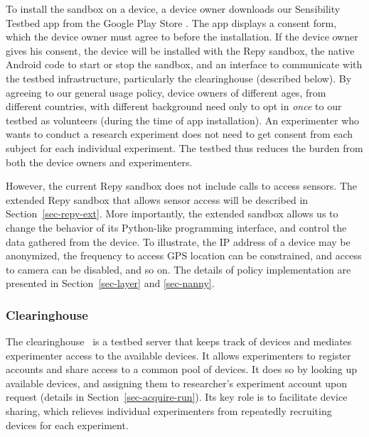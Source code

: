 To install the sandbox on a device, a device owner downloads 
our Sensibility Testbed app from the Google Play Store \cite{sensibility-app}.
The app displays a consent form, which the device owner must 
agree to before the installation. If the device owner gives his
consent, the device will be installed with the Repy sandbox, the native Android code to 
start or stop the sandbox, and an interface to communicate with the testbed 
infrastructure, particularly the clearinghouse (described below). 
By agreeing to our general usage policy, device 
owners of different ages, from different countries, with different
background need only to opt in \textit{once} to our testbed as 
volunteers (during the time of app installation). An experimenter 
who wants to conduct a research experiment 
does not need to get consent from each subject for each individual
experiment. The testbed thus reduces the burden from both the 
device owners and experimenters. 

However, the current Repy sandbox does not include calls to access sensors. 
The extended Repy sandbox that allows sensor access  
will be described in Section~\ref{sec-repy-ext}.
More importantly, the extended sandbox allows us to change the 
behavior of its Python-like programming interface, and control the 
data gathered from the device. 
To illustrate, the IP address of a device may be anonymized, 
the frequency to access GPS location can be constrained, and 
access to camera can be disabled, and so on. 
The details of policy implementation are presented in 
Section~\ref{sec-layer} and \ref{sec-nanny}.

\subsubsection{Clearinghouse}\label{sec-ch}
The clearinghouse~\cite{ch} is a testbed server that keeps 
track of devices and mediates experimenter access to the 
available devices. It allows experimenters to register 
accounts and share access to a common pool of devices.
It does so by looking up available devices, and assigning
them to researcher's experiment account upon request 
(details in Section~\ref{sec-acquire-run}). 
Its key role is to facilitate device sharing, 
which relieves individual experimenters from repeatedly 
recruiting devices for each experiment.

